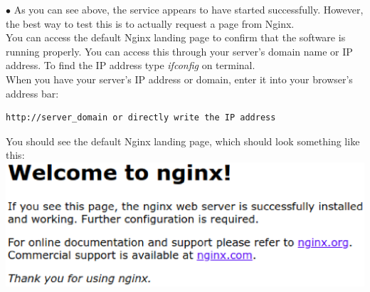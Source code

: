 \documentclass[journal,12pt,onecolumn]{IEEEtran}
\begin{document}
\begin{flushleft}
\begin{enumerate}
$\bullet$ As you can see above, the service appears to have started successfully. However, the best way to test this is to actually request a page from Nginx.\\
\medskip
You can access the default Nginx landing page to confirm that the software is running properly. You can access this through your server's domain name or IP address. To find the IP address type \textit{ifconfig} on terminal.\\
\medskip
When you have your server's IP address or domain, enter it into your browser's address bar:\\
\medskip
\begin{lstlisting}[frame=single,linewidth=15cm,breaklines=true]
http://server_domain or directly write the IP address
\end{lstlisting}
\bigskip
You should see the default Nginx landing page, which should look something like this:\\
\medskip
\includegraphics[scale=.4]{img2.eps}


\end{enumerate}
\end{flushleft}
\end{document}
